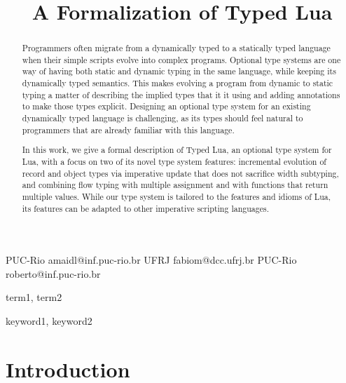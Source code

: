 \documentclass[preprint]{sigplanconf}
\begin{document}
\setlength{\pdfpageheight}{\paperheight}
\setlength{\pdfpagewidth}{\paperwidth}



\title{A Formalization of Typed Lua}

           {PUC-Rio}
           {amaidl@inf.puc-rio.br}
           {UFRJ}
           {fabiom@dcc.ufrj.br}
           {PUC-Rio}
           {roberto@inf.puc-rio.br}

\maketitle

\begin{abstract}
Programmers often migrate from a dynamically typed
to a statically typed language when their simple scripts
evolve into complex programs. Optional type systems are
one way of having both static and dynamic typing
in the same language, while keeping its dynamically typed
semantics. This makes evolving a program from dynamic to
static typing a matter of describing the implied types that
it it using and adding annotations to make those types explicit.
Designing an optional type system for
an existing dynamically typed language is challenging, as its types should feel natural to programmers that are already familiar with
this language.

In this work, we give a formal description of Typed Lua, an
optional type system for Lua, with a focus on two of its novel type system features: incremental evolution of record and object types via imperative update that does not sacrifice width subtyping, and combining flow typing with multiple assignment and with functions that return multiple values. While our type system is tailored to the features and idioms of Lua, its features can be adapted to other imperative scripting languages.
\end{abstract}


\terms
term1, term2

\keywords
keyword1, keyword2

\section{Introduction}
\label{sec:intro}
\end{document}
